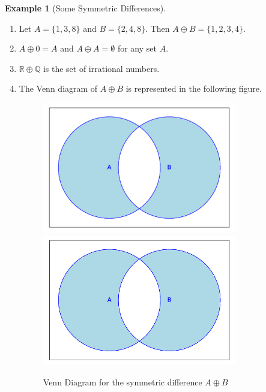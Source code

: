 \documentclass[10pt,]{book}
\theoremstyle{plain}
\theoremstyle{definition}
\newtheorem{example}[theorem]{Example}
\begin{document}
\label{notation-6}
\begin{example}[Some Symmetric Differences]\label{some_symmetric_differences}
\leavevmode%
\begin{enumerate}
\item\hypertarget{li-62}{}Let \(A = \{1, 3, 8\}\) and \(B = \{2, 4, 8\}\). Then \(A \oplus  B = \{1, 2, 3, 4\}\). 
\item\hypertarget{li-63}{}\(A \oplus  0 = A\) and \(A \oplus  A = \emptyset\) for any set \(A\). 
\item\hypertarget{li-64}{}\(\mathbb{R} \oplus  \mathbb{Q}\) is the set of irrational numbers. 
\item\hypertarget{li-65}{}The Venn diagram of \(A \oplus  B\) is represented in the following figure.
            \leavevmode%
\begin{figure}
\centering
{}%
{\includegraphics[width=0.80\textwidth]{images/sageplot-venn-symmetric.pdf}}%
{\includegraphics[width=0.80\textwidth]{images/sageplot-venn-symmetric.png}}
\caption{Venn Diagram for the symmetric difference \(A \oplus  B\)\label{venn_diagram_symmetric}}
\end{figure}
 
  
\end{enumerate}
\end{example}
\typeout{************************************************}
\typeout{************************************************}
\end{document}
